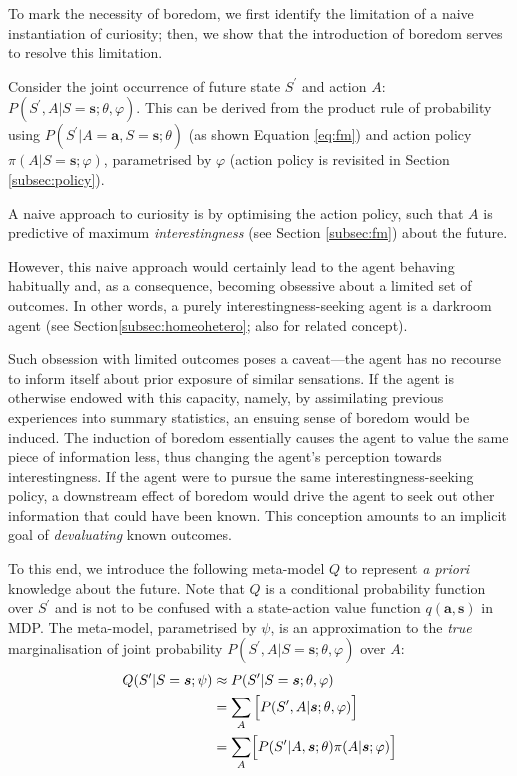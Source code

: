 \documentclass[utf8]{frontiersSCNS}
\newcommand{\bs}{\boldsymbol}
\begin{document}
To mark the necessity of boredom, we first identify the limitation of a naive instantiation of curiosity; then, we show that the introduction of boredom serves to resolve this limitation.

Consider the joint occurrence of future state $S^\prime$ and action $A$: $ P (S^\prime, A|S=\bs{s}; \theta, \varphi)$.  This can be derived from the product rule of probability using $P(S^\prime|A=\bs{a}, S=\bs{s}; \theta)$ (as shown Equation \ref{eq:fm}) and action policy $\pi(A|S=\bs{s}; \varphi)$, parametrised by $\varphi$ (action policy is revisited in Section \ref{subsec:policy}). 

A naive approach to curiosity is by optimising the action policy, such that $A$ is predictive of maximum {\it interestingness} (see Section \ref{subsec:fm}) about the future.

However, this naive approach would certainly lead to the agent behaving habitually and, as a consequence, becoming obsessive about a limited set of outcomes. In other words, a purely interestingness-seeking agent is a darkroom agent (see Section\ref{subsec:homeohetero}; also \citet{darkroom} for related concept).

Such obsession with limited outcomes poses a caveat---the agent has no recourse to inform itself about prior exposure of similar sensations. If the agent is otherwise endowed with this capacity, namely, by assimilating previous experiences into summary statistics, an ensuing sense of boredom would be induced. The induction of boredom essentially causes the agent to value the same piece of information less, thus changing the agent's perception towards interestingness. If the agent were to pursue the same interestingness-seeking policy, a downstream effect of boredom would drive the agent to seek out other information that could have been known. This conception amounts to an implicit goal of {\it devaluating} known outcomes.

To this end, we introduce the following meta-model $Q$ to represent {\it a priori} knowledge about the future. Note that $Q$ is a conditional probability function over $S^\prime$ and is not to be confused with a state-action value function $q(\bs a, \bs s)$ in MDP. The meta-model, parametrised by $\psi$, is an approximation to the {\it true} marginalisation of joint probability $P(S^\prime, A|S=\bs{s}; \theta, \varphi)$ over $A$:
%
	\begin{equation}
	\begin{aligned} \label{eq:mm}
	Q(S^\prime | S=\bs{s}; \psi) & \approx 
		P (S^\prime | S=\bs{s}; \theta, \varphi) \\
		&= \sum_A \Big[ P(S^\prime, A|\bs{s}; \theta, \varphi) \Bigr] \\
		&= \sum_A \Bigl[ P (S^\prime| A, \bs{s}; \theta) \pi(A|\bs{s}; \varphi) \Bigr] \\
	\end{aligned}
	\end{equation}
%
\end{document}
